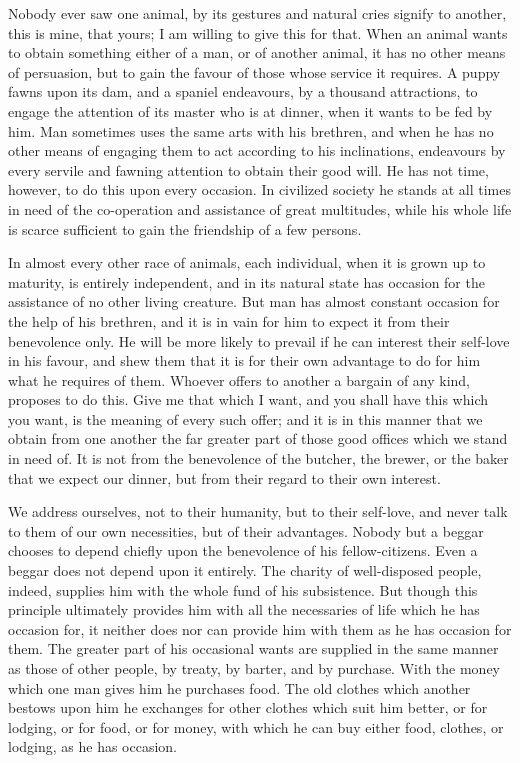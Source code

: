 Nobody ever saw one animal, by its gestures and natural cries signify to another, this is mine, that yours; I am willing to give this for that. When an animal wants to obtain something either of a man, or of another animal, it has no other means of persuasion, but to gain the favour of those whose service it requires. A puppy fawns upon its dam, and a spaniel endeavours, by a thousand attractions, to engage the attention of its master who is at dinner, when it wants to be fed by him. Man sometimes uses the same arts with his brethren, and when he has no other means of engaging them to act according to his inclinations, endeavours by every servile and fawning attention to obtain their good will. He has not time, however, to do this upon every occasion. In civilized society he stands at all times in need of the co-operation and assistance of great multitudes, while his whole life is scarce sufficient to gain the friendship of a few persons.\par

In almost every other race of animals, each individual, when it is grown up to maturity, is entirely independent, and in its natural state has occasion for the assistance of no other living creature. But man has almost constant occasion for the help of his brethren, and it is in vain for him to expect it from their benevolence only. He will be more likely to prevail if he can interest their self-love in his favour, and shew them that it is for their own advantage to do for him what he requires of them. Whoever offers to another a bargain of any kind, proposes to do this. Give me that which I want, and you shall have this which you want, is the meaning of every such offer; and it is in this manner that we obtain from one another the far greater part of those good offices which we stand in need of. It is not from the benevolence of the butcher, the brewer, or the baker that we expect our dinner, but from their regard to their own interest.\par

We address ourselves, not to their humanity, but to their self-love, and never talk to them of our own necessities, but of their advantages. Nobody but a beggar chooses to depend chiefly upon the benevolence of his fellow-citizens. Even a beggar does not depend upon it entirely. The charity of well-disposed people, indeed, supplies him with the whole fund of his subsistence. But though this principle ultimately provides him with all the necessaries of life which he has occasion for, it neither does nor can provide him with them as he has occasion for them. The greater part of his occasional wants are supplied in the same manner as those of other people, by treaty, by barter, and by purchase. With the money which one man gives him he purchases food. The old clothes which another bestows upon him he exchanges for other clothes which suit him better, or for lodging, or for food, or for money, with which he can buy either food, clothes, or lodging, as he has occasion.\par

